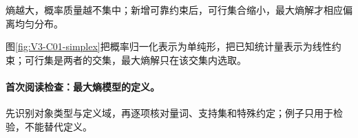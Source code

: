 \documentclass[UTF8,a4paper,11pt,openany]{ctexbook}
\begin{document}
\setcounter{page}{338}
\setcounter{chapter}{17}
\setcounter{figure}{0}
\pagestyle{headings}
\begin{probabilitybox}
熵越大，概率质量越不集中；新增可靠约束后，可行集合缩小，最大熵解才相应偏离均匀分布。
\end{probabilitybox}

图\ref{fig:V3-C01-simplex}把概率归一化表示为单纯形，把已知统计量表示为线性约束；可行集是两者的交集，最大熵解只在该交集内选取。
\paragraph{首次阅读检查：最大熵模型的定义。}
先识别对象类型与定义域，再逐项核对量词、支持集和特殊约定；例子只用于检验，不能替代定义。
\end{document}
